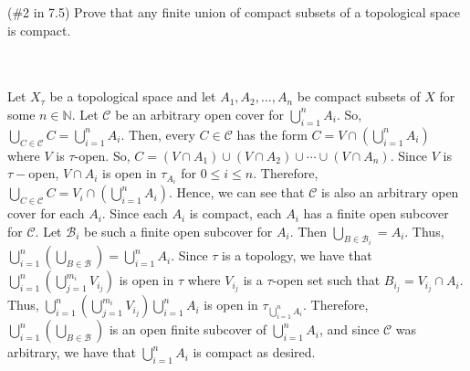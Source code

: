 (\#2 in 7.5) Prove that any finite union of compact subsets of a topological space is compact.\\\\

\begin{solution}\renewcommand{\qedsymbol}{}\ \\
    Let $X_{\tau}$ be a topological space and let $A_1, A_2,\ldots, A_n$ be compact subsets of $X$ for
    some $n\in\mathbb{N}$. Let $\mathcal{C}$ be an arbitrary open cover for $\bigcup_{i=1}^nA_i$. So,
    $\bigcup_{C\in\mathcal{C}}C=\bigcup_{i=1}^nA_i$. Then, every $C\in\mathcal{C}$ has the form
    $C=V\cap(\bigcup_{i=1}^nA_i)$ where $V$ is $\tau$-open. So,
    $C=(V\cap A_1)\cup(V\cap A_2)\cup\cdots\cup(V\cap A_n)$. Since $V$ is $\tau-$open, $V\cap A_i$ is
    open in $\tau_{A_i}$ for $0\leq i\leq n$. Therefore,
    $\bigcup_{C\in\mathcal{C}}C=V_i\cap(\bigcup_{i=1}^nA_i)$. Hence, we can see that $\mathcal{C}$ is
    also an arbitrary open cover for each $A_i$. Since each $A_i$ is compact, each $A_i$ has a finite
    open subcover for $\mathcal{C}$. Let $\mathcal{B}_i$ be such a finite open subcover for $A_i$. Then
    $\bigcup_{B\in\mathcal{B}_i}=A_i$. Thus,
    $\bigcup_{i=1}^n(\bigcup_{B\in\mathcal{B}})=\bigcup_{i=1}^nA_i$. Since $\tau$ is a topology, we have
    that $\bigcup_{i=1}^n(\bigcup_{j=1}^{m_i}V_{i_j})$ is open in $\tau$ where $V_{i_j}$ is a
    $\tau$-open set such that $B_{i_j}=V_{i_j}\cap A_i$. Thus,
    $\bigcup_{i=1}^n(\bigcup_{j=1}^{m_i}V_{i_j})\bigcup_{i=1}^nA_i$ is open in
    $\tau_{\bigcup_{i=1}^nA_i}$. Therefore, $\bigcup_{i=1}^n(\bigcup_{B\in\mathcal{B}})$ is an open
    finite subcover of $\bigcup_{i=1}^nA_i$, and since $\mathcal{C}$ was arbitrary, we have that
    $\bigcup_{i=1}^nA_i$ is compact as desired.

\end{solution}